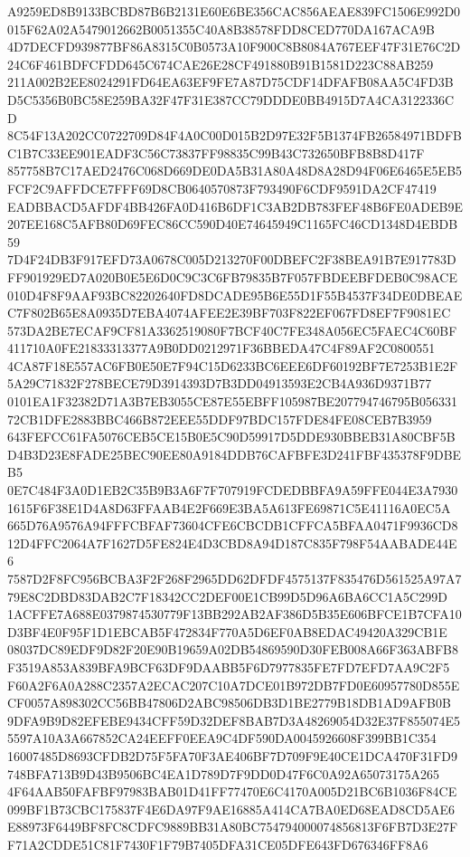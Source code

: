 \documentclass[UTF8,fontset=fandol,zihao=-4,a4paper]{ctexart}
\begin{document}
{{A9259ED8B9133BCBD87B6B2131E60E6BE356CAC856AEAE839FC1506E992D0015F62A02A5479012662B0051355C40A8B38578FDD8CED770DA167ACA9B
4D7DECFD939877BF86A8315C0B0573A10F900C8B8084A767EEF47F31E76C2D24C6F461BDFCFDD645C674CAE26E28CF491880B91B1581D223C88AB259
211A002B2EE8024291FD64EA63EF9FE7A87D75CDF14DFAFB08AA5C4FD3BD5C5356B0BC58E259BA32F47F31E387CC79DDDE0BB4915D7A4CA3122336CD
8C54F13A202CC0722709D84F4A0C00D015B2D97E32F5B1374FB26584971BDFBC1B7C33EE901EADF3C56C73837FF98835C99B43C732650BFB8B8D417F
857758B7C17AED2476C068D669DE0DA5B31A80A48D8A28D94F06E6465E5EB5FCF2C9AFFDCE7FFF69D8CB0640570873F793490F6CDF9591DA2CF47419
EADBBACD5AFDF4BB426FA0D416B6DF1C3AB2DB783FEF48B6FE0ADEB9E207EE168C5AFB80D69FEC86CC590D40E74645949C1165FC46CD1348D4EBDB59
7D4F24DB3F917EFD73A0678C005D213270F00DBEFC2F38BEA91B7E917783DFF901929ED7A020B0E5E6D0C9C3C6FB79835B7F057FBDEEBFDEB0C98ACE
010D4F8F9AAF93BC82202640FD8DCADE95B6E55D1F55B4537F34DE0DBEAEC7F802B65E8A0935D7EBA4074AFEE2E39BF703F822EF067FD8EF7F9081EC
573DA2BE7ECAF9CF81A3362519080F7BCF40C7FE348A056EC5FAEC4C60BF411710A0FE21833313377A9B0DD0212971F36BBEDA47C4F89AF2C0800551
4CA87F18E557AC6FB0E50E7F94C15D6233BC6EEE6DF60192BF7E7253B1E2F5A29C71832F278BECE79D3914393D7B3DD04913593E2CB4A936D9371B77
0101EA1F32382D71A3B7EB3055CE87E55EBFF105987BE207794746795B05633172CB1DFE2883BBC466B872EEE55DDF97BDC157FDE84FE08CEB7B3959
643FEFCC61FA5076CEB5CE15B0E5C90D59917D5DDE930BBEB31A80CBF5BD4B3D23E8FADE25BEC90EE80A9184DDB76CAFBFE3D241FBF435378F9DBEB5
0E7C484F3A0D1EB2C35B9B3A6F7F707919FCDEDBBFA9A59FFE044E3A79301615F6F38E1D4A8D63FFAAB4E2F669E3BA5A613FE69871C5E41116A0EC5A
665D76A9576A94FFFCBFAF73604CFE6CBCDB1CFFCA5BFAA0471F9936CD812D4FFC2064A7F1627D5FE824E4D3CBD8A94D187C835F798F54AABADE44E6
7587D2F8FC956BCBA3F2F268F2965DD62DFDF4575137F835476D561525A97A779E8C2DBD83DAB2C7F18342CC2DEF00E1CB99D5D96A6BA6CC1A5C299D
1ACFFE7A688E0379874530779F13BB292AB2AF386D5B35E606BFCE1B7CFA10D3BF4E0F95F1D1EBCAB5F472834F770A5D6EF0AB8EDAC49420A329CB1E
08037DC89EDF9D82F20E90B19659A02DB54869590D30FEB008A66F363ABFB8F3519A853A839BFA9BCF63DF9DAABB5F6D7977835FE7FD7EFD7AA9C2F5
F60A2F6A0A288C2357A2ECAC207C10A7DCE01B972DB7FD0E60957780D855ECF0057A898302CC56BB47806D2ABC98506DB3D1BE2779B18DB1AD9AFB0B
9DFA9B9D82EFEBE9434CFF59D32DEF8BAB7D3A48269054D32E37F855074E55597A10A3A667852CA24EEFF0EEA9C4DF590DA0045926608F399BB1C354
16007485D8693CFDB2D75F5FA70F3AE406BF7D709F9E40CE1DCA470F31FD9748BFA713B9D43B9506BC4EA1D789D7F9DD0D47F6C0A92A65073175A265
4F64AAB50FAFBF97983BAB01D41FF77470E6C4170A005D21BC6B1036F84CE099BF1B73CBC175837F4E6DA97F9AE16885A414CA7BA0ED68EAD8CD5AE6
E88973F6449BF8FC8CDFC9889BB31A80BC754794000074856813F6FB7D3E27FF71A2CDDE51C81F7430F1F79B7405DFA31CE05DFE643FD676346FF8A6
}}
\end{document}
